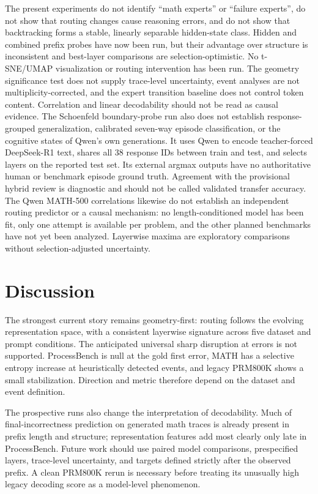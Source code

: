 \documentclass[manuscript,screen,review]{jair}
\begin{document}
The present experiments do not identify ``math experts'' or ``failure
experts'', do not show that routing changes cause reasoning errors, and do not
show that backtracking forms a stable, linearly separable hidden-state class.
Hidden and combined prefix probes have now been run, but their advantage over
structure is inconsistent and best-layer comparisons are selection-optimistic.
No t-SNE/UMAP visualization or routing intervention has been run.  The
geometry significance test does not supply trace-level uncertainty, event
analyses are not multiplicity-corrected, and the expert transition baseline
does not control token content.  Correlation and linear decodability should
not be read as causal evidence.  The Schoenfeld boundary-probe run also does
not establish response-grouped generalization, calibrated seven-way episode
classification, or the cognitive states of Qwen's own generations.  It uses
Qwen to encode teacher-forced DeepSeek-R1 text, shares all 38 response IDs
between train and test, and selects layers on the reported test set.  Its
external argmax outputs have no authoritative human or benchmark episode
ground truth.  Agreement with the provisional hybrid review is diagnostic and
should not be called validated transfer accuracy.  The Qwen MATH-500
correlations likewise do not establish an independent routing predictor or a
causal mechanism: no length-conditioned model has been fit, only one attempt
is available per problem, and the other planned benchmarks have not yet been
analyzed.  Layerwise maxima are exploratory comparisons without
selection-adjusted uncertainty.

\section{Discussion}

The strongest current story remains geometry-first: routing follows the
evolving representation space, with a consistent layerwise signature across
five dataset and prompt conditions.  The anticipated universal sharp disruption
at errors is not supported.  ProcessBench is null at the gold first error,
MATH has a selective entropy increase at heuristically detected events, and
legacy PRM800K shows a small stabilization.  Direction and metric therefore
depend on the dataset and event definition.

The prospective runs also change the interpretation of decodability.  Much of
final-incorrectness prediction on generated math traces is already present in
prefix length and structure; representation features add most clearly only
late in ProcessBench.  Future work should use paired model comparisons,
prespecified layers, trace-level uncertainty, and targets defined strictly
after the observed prefix.  A clean PRM800K rerun is necessary before treating
its unusually high legacy decoding score as a model-level phenomenon.
\end{document}
